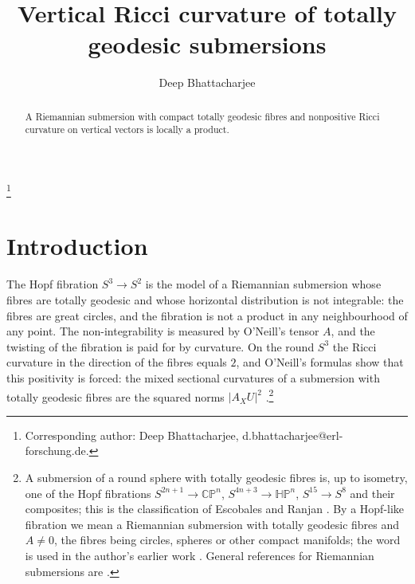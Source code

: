 \documentclass[11pt,reqno]{amsart}
\theoremstyle{plain}
\theoremstyle{definition}
\newcommand{\CP}{\mathbb{CP}}
\begin{document}
\title{Vertical Ricci curvature of totally geodesic submersions}

\author{Deep Bhattacharjee}
\address{Electro-Gravitational Space Propulsion Laboratory (EGSPL), Bhubaneswar, Odisha 751030, India}
\address{Formerly, University of Calcutta (Heramba Chandra College), 23/49 Gariahat Road, Golpark, Kolkata 700029, West Bengal, India}
\thanks{Corresponding author: Deep Bhattacharjee, d.bhattacharjee@erl-forschung.de.}


\begin{abstract}
A Riemannian submersion with compact totally geodesic fibres and nonpositive Ricci curvature on vertical vectors is locally a product.
\end{abstract}

\maketitle

\section{Introduction}\label{sec:intro}

The Hopf fibration $S^3\to S^2$ is the model of a Riemannian submersion whose fibres are totally geodesic and whose horizontal distribution is not integrable: the fibres are great circles, and the fibration is not a product in any neighbourhood of any point. The non-integrability is measured by O'Neill's tensor $A$, and the twisting of the fibration is paid for by curvature. On the round $S^3$ the Ricci curvature in the direction of the fibres equals $2$, and O'Neill's formulas show that this positivity is forced: the mixed sectional curvatures of a submersion with totally geodesic fibres are the squared norms $|A_XU|^2$ \cite{ONeill1966}.\footnote{A submersion of a round sphere with totally geodesic fibres is, up to isometry, one of the Hopf fibrations $S^{2n+1}\to\CP^n$, $S^{4n+3}\to\mathbb{HP}^n$, $S^{15}\to S^8$ and their composites; this is the classification of Escobales \cite{Escobales1975} and Ranjan \cite{Ranjan1985}. By a Hopf-like fibration we mean a Riemannian submersion with totally geodesic fibres and $A\neq0$, the fibres being circles, spheres or other compact manifolds; the word is used in the author's earlier work \cite{Bhattacharjee2026Hopf}. General references for Riemannian submersions are \cite{Besse1987,FalcitelliIanusPastore2004,GromollWalschap2009}.}
\end{document}
